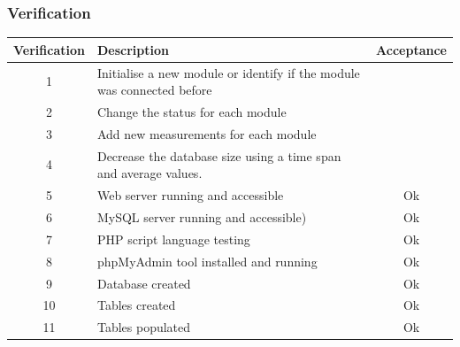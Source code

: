 %	
\subsubsection{Verification}
\begin{table}[H]
\centering
	\begin{tabular}{| c | l | c |}
		\hline
		Verification & Description & Acceptance \\\hline
		1 & Initialise a new module or identify if the module was connected before & ~ \\\hline
		2 & Change the status for each module & ~ \\\hline
		3 & Add new measurements for each module & ~ \\\hline
		4 & Decrease the database size using a time span and average values. & ~ \\\hline
		5 & Web server running and accessible & Ok \\\hline
		6 & MySQL server running and accessible) & Ok \\\hline
		7 & PHP script language testing & Ok \\\hline
		8 & phpMyAdmin tool installed and running & Ok \\\hline
		9 & Database created & Ok \\\hline
		10 & Tables created & Ok \\\hline
		11 & Tables populated & Ok \\\hline
	\end{tabular}
\end{table}
